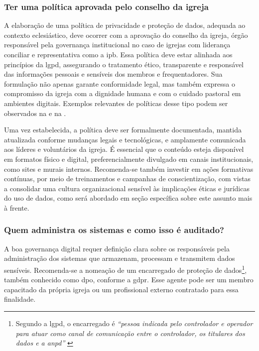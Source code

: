 \subsubsection{Ter uma política aprovada pelo conselho da igreja}

A elaboração de uma política de privacidade e proteção de dados, adequada ao contexto eclesiástico, deve ocorrer com a aprovação do conselho da igreja, órgão responsável pela governança institucional no caso de igrejas com liderança conciliar e representativa como a \gls{ipb}. Essa política deve estar alinhada aos princípios da \gls{lgpd}, assegurando o tratamento ético, transparente e responsável das informações pessoais e sensíveis dos membros e frequentadores. Sua formulação não apenas garante conformidade legal, mas também expressa o compromisso da igreja com a dignidade humana e com o cuidado pastoral em ambientes digitais. Exemplos relevantes de políticas desse tipo podem ser observados na  e na .

Uma vez estabelecida, a política deve ser formalmente documentada, mantida atualizada conforme mudanças legais e tecnológicas, e amplamente comunicada aos líderes e voluntários da igreja. É essencial que o conteúdo esteja disponível em formatos físico e digital, preferencialmente divulgado em canais institucionais, como sites e murais internos. Recomenda-se também investir em ações formativas contínuas, por meio de treinamentos e campanhas de conscientização, com vistas a consolidar uma cultura organizacional sensível às implicações éticas e jurídicas do uso de dados, como será abordado em seção específica sobre este assunto mais à frente.

\subsubsection{Quem administra os sistemas e como isso é auditado?}

A boa governança digital requer definição clara sobre os responsáveis pela administração dos sistemas que armazenam, processam e transmitem dados sensíveis. Recomenda-se a nomeação de um encarregado de proteção de dados\footnote{Segundo a \gls{lgpd}, o encarregado é \textit{``pessoa indicada pelo controlador e operador para atuar como canal de comunicação entre o controlador, os titulares dos dados e a \gls{anpd}''} \cite[art.~5º, inciso~VIII]{lgpd2018}}, também conhecido como \gls{dpo}, conforme a \gls{gdpr}. Esse agente pode ser um membro capacitado da própria igreja ou um profissional externo contratado para essa finalidade.

